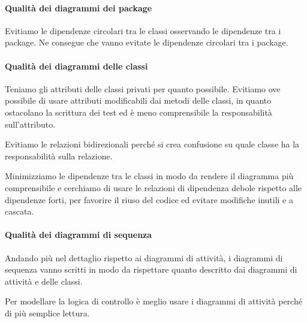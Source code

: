         \paragraph{Qualità dei diagrammi dei package}
        Evitiamo le dipendenze circolari tra le classi osservando le dipendenze tra i package. Ne consegue che vanno evitate le dipendenze circolari tra i package.

		\paragraph{Qualità dei diagrammi delle classi}
		Teniamo gli attributi delle classi privati per quanto possibile.
        Evitiamo ove possibile di usare attributi modificabili dai metodi delle classi, in quanto ostacolano la scrittura dei test ed è meno comprensibile la responsabilità sull'attributo.\par
        Evitiamo le relazioni bidirezionali perché si crea confusione su quale classe ha la responsabilità sulla relazione.\par
        Minimizziamo le dipendenze tra le classi in modo da rendere il diagramma più comprensibile e cerchiamo di usare le relazioni di dipendenza debole rispetto alle dipendenze forti, per favorire il riuso del codice ed evitare modifiche inutili e a cascata.


		\paragraph{Qualità dei diagrammi di sequenza}
		Andando più nel dettaglio rispetto ai diagrammi di attività, i diagrammi di sequenza vanno scritti in modo da rispettare quanto descritto dai diagrammi di attività e delle classi.\par
        Per modellare la logica di controllo è meglio usare i diagrammi di attività perché di più semplice lettura.


